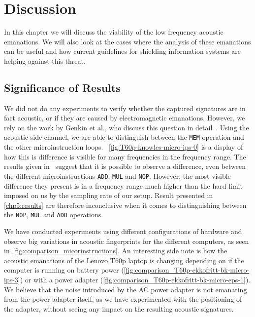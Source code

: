 \chapter{Discussion}\label{chp6:discussion}
In this chapter we will discuss the viability of the low frequency acoustic emanations.
We will also look at the cases where the analysis of these emanations can be useful and how current guidelines for shielding information systems are helping against this threat.

\section{Significance of Results}
We did not do any experiments to verify whether the captured signatures are in fact acoustic, or if they are caused by electromagnetic emanations.
However, we rely on the work by Genkin et al., who discuss this question in detail~\cite[Section 3.3]{DBLP:journals/iacr/GenkinST13}.
Using the acoustic side channel, we are able to distinguish between the \texttt{MEM} operation and the other microinstruction loops.
~\autoref{fig:T60p-knowles-micro-ips-0} is a display of how this is difference is visible for many frequencies in the frequency range.
The results given in~\cite[Fig.~2]{DBLP:conf/crypto/GenkinST14} suggest that it is possible to observe a difference, even between the different microinstructions \texttt{ADD}, \texttt{MUL} and \texttt{NOP}. 
However, the most visible difference they present is in a frequency range much higher than the hard limit imposed on us by the sampling rate of our setup.
Result presented in \autoref{chp5:results} are therefore inconclusive when it comes to distinguishing between the \texttt{NOP}, \texttt{MUL} and \texttt{ADD} operations.


We have conducted experiments using different configurations of hardware and observe big variations in acoustic fingerprints for the different computers, as seen in~\autoref{fig:comparison_micorinstructions}.
An interesting side note is how the acoustic emanations of the Lenovo T60p laptop is changing depending on if the computer is running on battery power (\autoref{fig:comparison_T60p-ekkofritt-bk-micro-ips-3}) or with a power adapter (\autoref{fig:comparison_T60p-ekkofritt-bk-micro-eps-1}).
We believe that the noise introduced by the \gls{AC} power adapter is not emanating from the power adapter itself, as we have experimented with the positioning of the adapter, without seeing any impact on the resulting acoustic signatures.


